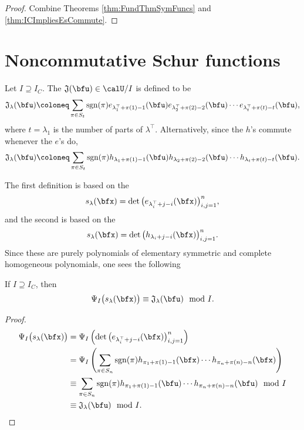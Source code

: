 \documentclass{article}
\newcommand*\frkJ{\mathfrak{J}}
\newcommand*\sgn{\operatorname{sgn}}
\begin{document}
\begin{proof}
    Combine Theorems \ref{thm:FundThmSymFuncs} and \ref{thm:ICImpliesEsCommute}.
\end{proof}



\section{
    Noncommutative Schur functions
}

\begin{definition}
    Let $I \supseteq I_C$.
    The  $\frkJ(\bfu) \in \calU/I$ is defined to be
    \[
        \frkJ_\lambda(\bfu)
        \coloneq
        \sum_{\pi \in S_{t}}
        \sgn(\pi)
        e_{\lambda^\top_1+\pi(1)-1}(\bfu)
        e_{\lambda^\top_2+\pi(2)-2}(\bfu)
        \cdots
        e_{\lambda^\top_{t}+\pi(t)-t}(\bfu),
    \]
    where $t = \lambda_1$ is the number of parts of $\lambda^\top$.
    Alternatively, since the $h$'s commute whenever the $e$'s do,
    \[
        \frkJ_\lambda(\bfu)
        \coloneq
        \sum_{\pi \in S_{t}}
        \sgn(\pi)
        h_{\lambda_1+\pi(1)-1}(\bfu)
        h_{\lambda_2+\pi(2)-2}(\bfu)
        \cdots
        h_{\lambda_t+\pi(t)-t}(\bfu).
    \]
\end{definition}

The first definition is based on the 
\[
    s_\lambda(\bfx)
    =
    \det\big(e_{\lambda^\top_i+j-i}(\bfx)\big)_{i,j=1}^n,
\]
and the second is based on the 
\[
    s_\lambda(\bfx)
    =
    \det\big(h_{\lambda_i+j-i}(\bfx)\big)_{i,j=1}^n.
\]
Since these are purely polynomials of elementary symmetric and complete homogeneous polynomials, one sees the following
\begin{definition}
    If $I \supseteq I_C$, then
    \[
        \Psi_I\big(s_\lambda(\bfx)\big)
        \equiv
        \frkJ_\lambda(\bfu)
        \mod I.
    \]
\end{definition}
\begin{proof}
    \begin{align*}
        \Psi_I\big(s_\lambda(\bfx)\big)
        &=
        \Psi_I \left(
            \det\big(e_{\lambda^\top_i+j-i}(\bfx)\big)_{i,j=1}^n
        \right)
        \\
        &=
        \Psi_I \left(
            \sum_{\pi \in S_n}
            \sgn(\pi)
            h_{\pi_1+\pi(1)-1}(\bfx)
            \cdots
            h_{\pi_n+\pi(n)-n}(\bfx)
        \right)
        \\
        &\equiv
        \sum_{\pi \in S_n}
        \sgn(\pi)
        h_{\pi_1+\pi(1)-1}(\bfu)
        \cdots
        h_{\pi_n+\pi(n)-n}(\bfu) \mod I
        \\
        &\equiv
        \frkJ_\lambda(\bfu) \mod I.
    \end{align*}
\end{proof}
\end{document}
